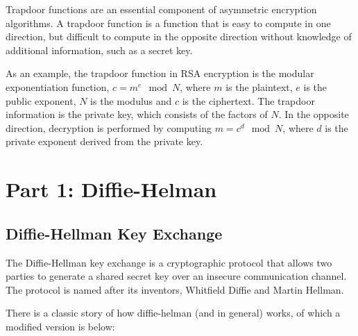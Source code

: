 \documentclass{article}
\begin{document}
Trapdoor functions are an essential component of asymmetric encryption algorithms. A trapdoor function is a function that is easy to compute in one direction, but difficult to compute in the opposite direction without knowledge of additional information, such as a secret key.

\vspace{2mm}
As an example, the trapdoor function in RSA encryption is the modular exponentiation function, $c = m^e \mod N$, where $m$ is the plaintext, $e$ is the public exponent, $N$ is the modulus and $c$ is the ciphertext. The trapdoor information is the private key, which consists of the factors of $N$. In the opposite direction, decryption is performed by computing $m = c^d \mod N$, where $d$ is the private exponent derived from the private key.


\section*{Part 1: Diffie-Helman}

\subsection*{Diffie-Hellman Key Exchange}

The Diffie-Hellman key exchange is a cryptographic protocol that allows two parties to generate a shared secret key over an insecure communication channel. The protocol is named after its inventors, Whitfield Diffie and Martin Hellman.

There is a classic story of how diffie-helman (and in general) works, of which a modified version is below:
\end{document}
